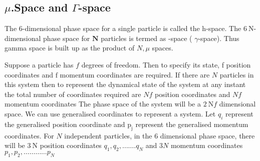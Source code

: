 \subsection{$\mu$.Space and $\Gamma$-space}
 The 6-dimensional phase space for a single particle is called the h-space. The $6 \mathrm{~N}$-dimensional phase space for $\mathbf{N}$ particles is termed as -space ( $\gamma$-space). Thus gamma space is built up as the product of $N, \mu$ spaces.\\
\par Suppose a particle has $f$ degrees of freedom. Then to specify its state, f position coordinates and $\mathrm{f}$ momentum coordinates are required.
If there are $N$ particles in this system then to represent the dynamical state of the system at any instant the total number of coordinates required are $N f$ position coordinates and $N f$ momentum coordinates The phase space of the system will be a $2 \mathrm{~N} f$ dimensional space. We can use generalised coordinates to represent a system. Let $q_{i}$ represent the generalised position coordinate and $\mathrm{p}_{\mathrm{j}}$ represent the generalised momentum coordinates. For $N$ independent particles, in the 6 dimensional phase space, there will be $3 \mathrm{~N}$ position coordinates
$q_{1}, q_{2}, \ldots \ldots . q_{N}$ and $3 N$ momentum coordinates $p_{1}, p_{2}, \ldots \ldots \ldots \ldots p_{N}$
